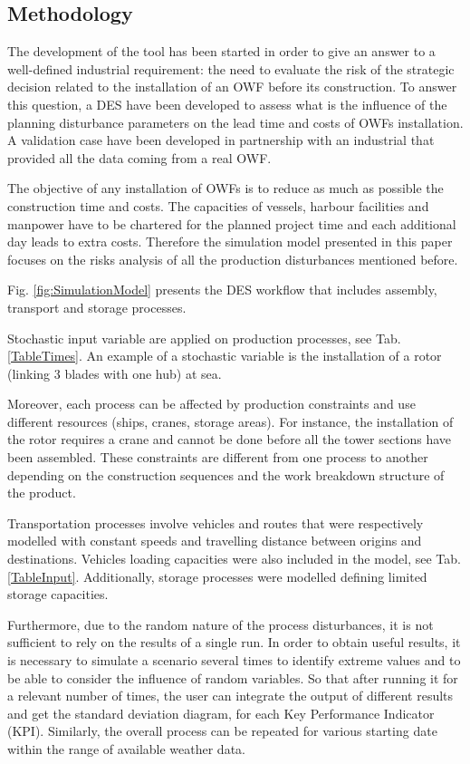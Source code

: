 \subsection{Methodology}
The development of the tool has been started in order to give an answer to a well-defined industrial requirement: the need to evaluate the risk of the strategic decision related to the installation of an OWF before its construction. To answer this question, a DES have been developed to assess what is the influence of the planning disturbance parameters on the lead time and costs of OWFs installation. A validation case have been developed in partnership with an industrial that provided all the data coming from a real OWF.

The objective of any installation of OWFs is to reduce as much as possible the construction time and costs. The capacities of vessels, harbour facilities and manpower have to be chartered for the planned project time and each additional day leads to extra costs. Therefore the simulation model presented in this paper focuses on the risks analysis of all the production disturbances mentioned before.

Fig. \ref{fig:SimulationModel} presents the DES workflow that includes assembly, transport and storage processes.

Stochastic input variable are applied on production processes, see Tab. \ref{TableTimes}. An example of a stochastic variable is the installation of a rotor (linking 3 blades with one hub) at sea. 

Moreover, each process can be affected by production constraints and use different resources (ships, cranes, storage areas). For instance, the installation of the rotor requires a crane and cannot be done before all the tower sections have been assembled. These constraints are different from one process to another depending on the construction sequences and the work breakdown structure of the product.

Transportation processes involve vehicles and routes that were respectively modelled with constant speeds and travelling distance between origins and destinations. Vehicles loading capacities were also included in the model, see Tab. \ref{TableInput}. Additionally, storage processes were modelled defining limited storage capacities.

Furthermore, due to the random nature of the process disturbances, it is not sufficient to rely on the results of a single run. In order to obtain useful results, it is necessary to simulate a scenario several times to identify extreme values and to be able to consider the influence of random variables. So that after running it for a relevant number of times, the user can integrate the output of different results and get the standard deviation diagram, for each Key Performance Indicator (KPI). Similarly, the overall process can be repeated for various starting date within the range of available weather data.

